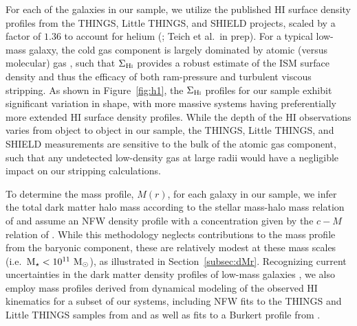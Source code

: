 For each of the galaxies in our sample, we utilize the published
H{\scriptsize I} surface density profiles from the THINGS, Little
THINGS, and SHIELD projects, scaled by a factor of $1.36$ to account
for helium (\citealt{leroy08, hunter12, teich15}; Teich et al.~in
prep).
%
For a typical low-mass galaxy, the cold gas component is largely
dominated by atomic (versus molecular) gas \citep[e.g.][]{popping14,
  boselli14}, such that $\Sigma_{\rm H\scalebox{0.45}{\rm I}}$
provides a robust estimate of the ISM surface density and thus the
efficacy of both ram-pressure and turbulent viscous stripping.
%
As shown in Figure~\ref{fig:h1}, the $\Sigma_{\rm H\scalebox{0.45}{\rm
    I}}$ profiles for our sample exhibit significant variation in
shape, with more massive systems having preferentially more extended
H{\scriptsize I} surface density profiles.
%
While the depth of the H{\scriptsize I} observations varies from
object to object in our sample, the THINGS, Little THINGS, and SHIELD
measurements are sensitive to the bulk of the atomic gas component,
such that any undetected low-density gas at large radii would have a
negligible impact on our stripping calculations. 
%

To determine the mass profile, $M(r)$, for each galaxy in our sample,
we infer the total dark matter halo mass according to the stellar
mass-halo mass relation of \citet{gk14} and assume an NFW density
profile \citep{nfw97} with a concentration given by the $c-M$ relation
of \citet{klypin11}.
%
While this methodology neglects contributions to the mass profile from
the baryonic component, these are relatively modest at these mass
scales (i.e.~${\rm M}_{\star} < 10^{11}~{\rm M}_{\odot}$), as illustrated in
Section~\ref{subsec:dMr}.
%
Recognizing current uncertainties in the dark matter density profiles
of low-mass galaxies \citep[e.g.][]{moore94, deblok01, bk11, bk12}, we
also employ mass profiles derived from dynamical modeling of the
observed H{\scriptsize I} kinematics for a subset of our systems,
including NFW fits to the THINGS and Little THINGS samples from
\citet{deblok08} and \citet{oh15} as well as fits to a Burkert profile
\citep{burkert95} from \citet{pace16}.



